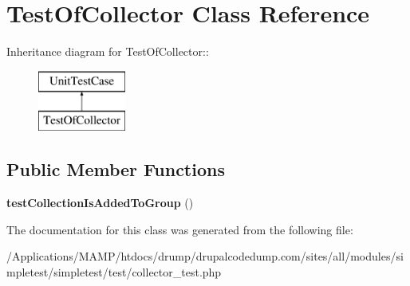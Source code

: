 \hypertarget{class_test_of_collector}{
\section{TestOfCollector Class Reference}
\label{class_test_of_collector}
}
Inheritance diagram for TestOfCollector::\begin{figure}[H]
\begin{center}
\leavevmode
\includegraphics[height=2cm]{class_test_of_collector}
\end{center}
\end{figure}
\subsection*{Public Member Functions}
\begin{DoxyCompactItemize}
\item 
\hypertarget{class_test_of_collector_a3943f7df2ce3d6b87cbfe6489381cc00}{
{\bfseries testCollectionIsAddedToGroup} ()}
\label{class_test_of_collector_a3943f7df2ce3d6b87cbfe6489381cc00}

\end{DoxyCompactItemize}


The documentation for this class was generated from the following file:\begin{DoxyCompactItemize}
\item 
/Applications/MAMP/htdocs/drump/drupalcodedump.com/sites/all/modules/simpletest/simpletest/test/collector\_\-test.php\end{DoxyCompactItemize}

